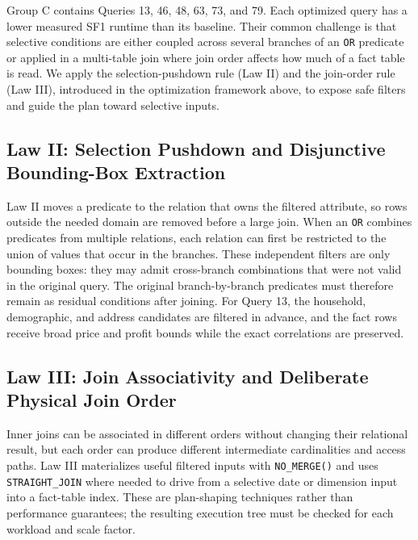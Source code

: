 \documentclass{ULBreport}
\begin{document}
Group C contains Queries 13, 46, 48, 63, 73, and 79. Each optimized query has a lower measured SF1 runtime than its baseline. Their common challenge is that selective conditions are either coupled across several branches of an \texttt{OR} predicate or applied in a multi-table join where join order affects how much of a fact table is read. We apply the selection-pushdown rule (Law II) and the join-order rule (Law III), introduced in the optimization framework above, to expose safe filters and guide the plan toward selective inputs.

\subsection{Law II: Selection Pushdown and Disjunctive Bounding-Box Extraction}

Law II moves a predicate to the relation that owns the filtered attribute, so rows outside the needed domain are removed before a large join. When an \texttt{OR} combines predicates from multiple relations, each relation can first be restricted to the union of values that occur in the branches. These independent filters are only bounding boxes: they may admit cross-branch combinations that were not valid in the original query. The original branch-by-branch predicates must therefore remain as residual conditions after joining. For Query 13, the household, demographic, and address candidates are filtered in advance, and the fact rows receive broad price and profit bounds while the exact correlations are preserved.

\subsection{Law III: Join Associativity and Deliberate Physical Join Order}

Inner joins can be associated in different orders without changing their relational result, but each order can produce different intermediate cardinalities and access paths. Law III materializes useful filtered inputs with \texttt{NO\_MERGE()} and uses \texttt{STRAIGHT\_JOIN} where needed to drive from a selective date or dimension input into a fact-table index. These are plan-shaping techniques rather than performance guarantees; the resulting execution tree must be checked for each workload and scale factor.
\end{document}
